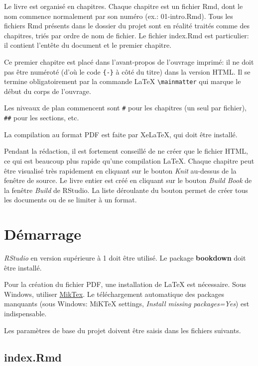 \documentclass[
  11pt,
  french,
  a4paper,
  extrafontsizes,onecolumn,openright
  ]{memoir}
\begin{document}
\normalsize

Le livre est organisé en chapitres.
Chaque chapitre est un fichier Rmd, dont le nom commence normalement par son numéro (ex.: 01-intro.Rmd).
Tous les fichiers Rmd présents dans le dossier du projet sont en réalité traités comme des chapitres, triés par ordre de nom de fichier.
Le fichier index.Rmd est particulier: il contient l'entête du document et le premier chapitre.

Ce premier chapitre est placé dans l'avant-propos de l'ouvrage imprimé: il ne doit pas être numéroté (d'où le code \texttt{\{-\}} à côté du titre) dans la version HTML. Il se termine obligatoirement par la commande LaTeX \texttt{\textbackslash{}mainmatter} qui marque le début du corps de l'ouvrage.

Les niveaux de plan commencent sont \texttt{\#} pour les chapitres (un seul par fichier), \texttt{\#\#} pour les sections, etc.

La compilation au format PDF est faite par XeLaTeX, qui doit être installé.

Pendant la rédaction, il est fortement conseillé de ne créer que le fichier HTML, ce qui est beaucoup plus rapide qu'une compilation LaTeX.
Chaque chapitre peut être visualisé très rapidement en cliquant sur le bouton \emph{Knit} au-dessus de la fenêtre de source.
Le livre entier est créé en cliquant sur le bouton \emph{Build Book} de la fenêtre \emph{Build} de RStudio.
La liste déroulante du bouton permet de créer tous les documents ou de se limiter à un format.

\mainmatter

\hypertarget{Demarrage}{%
\chapter{Démarrage}\label{Demarrage}}

\emph{RStudio} en version supérieure à 1 doit être utilisé.
Le package \textbf{bookdown} doit être installé.

Pour la création du fichier PDF, une installation de LaTeX est nécessaire.
Sous Windows, utiliser \href{https://miktex.org/download}{MikTex}.
Le téléchargement automatique des packages manquants (sous Windows: MiKTeX settings, \emph{Install missing packages=Yes}) est indispensable.

Les paramètres de base du projet doivent être saisis dans les fichiers suivants.

\hypertarget{index.rmd}{%
\section{index.Rmd}\label{index.rmd}}
\end{document}
